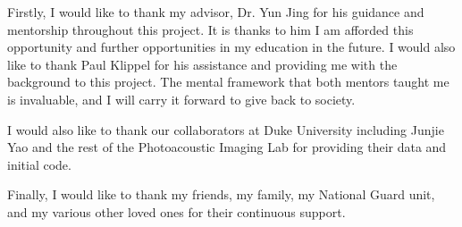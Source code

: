 Firstly, I would like to thank my advisor, Dr. Yun Jing for his guidance and mentorship throughout this project. It is thanks to him I am afforded this opportunity and further opportunities in my education in the future. I would also like to thank Paul Klippel for his assistance and providing me with the background to this project. The mental framework that both mentors taught me is invaluable, and I will carry it forward to give back to society. 

I would also like to thank our collaborators at Duke University including Junjie Yao and the rest of the Photoacoustic Imaging Lab for providing their data and initial code. 

Finally, I would like to thank my friends, my family, my National Guard unit, and my various other loved ones for their continuous support.